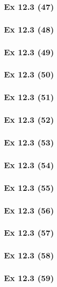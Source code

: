 \subsubsection{Ex 12.3 (47)}\label{sec:Ex_12.3.47}

\subsubsection{Ex 12.3 (48)}\label{sec:Ex_12.3.48}

\subsubsection{Ex 12.3 (49)}\label{sec:Ex_12.3.49}

\subsubsection{Ex 12.3 (50)}\label{sec:Ex_12.3.50}

\newpage		%

\subsubsection{Ex 12.3 (51)}\label{sec:Ex_12.3.51}

\subsubsection{Ex 12.3 (52)}\label{sec:Ex_12.3.52}

\subsubsection{Ex 12.3 (53)}\label{sec:Ex_12.3.53}

\subsubsection{Ex 12.3 (54)}\label{sec:Ex_12.3.54}

\subsubsection{Ex 12.3 (55)}\label{sec:Ex_12.3.55}

\subsubsection{Ex 12.3 (56)}\label{sec:Ex_12.3.56}

\subsubsection{Ex 12.3 (57)}\label{sec:Ex_12.3.57}

\subsubsection{Ex 12.3 (58)}\label{sec:Ex_12.3.58}

\subsubsection{Ex 12.3 (59)}\label{sec:Ex_12.3.59}

\newpage		%